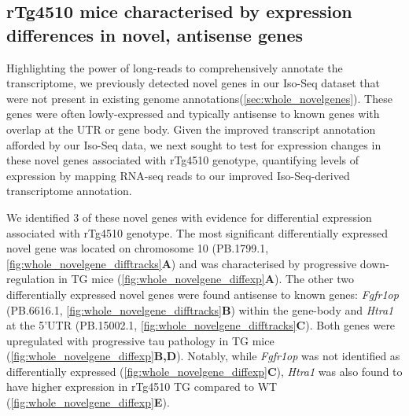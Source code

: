 \clearpage
\subsection{rTg4510 mice characterised by expression differences in novel, antisense genes}
Highlighting the power of long-reads to comprehensively annotate the transcriptome, we previously detected novel genes in our Iso-Seq dataset that were not present in existing genome annotations(\cref{sec:whole_novelgenes}). These genes were often lowly-expressed and typically antisense to known genes with overlap at the UTR or gene body. Given the improved transcript annotation afforded by our Iso-Seq data, we next sought to test for expression changes in these novel genes associated with rTg4510 genotype, quantifying levels of expression by mapping RNA-seq reads to our improved Iso-Seq-derived transcriptome annotation. 

We identified 3 of these novel genes with evidence for differential expression associated with rTg4510 genotype. The most significant differentially expressed novel gene was located on chromosome 10 (PB.1799.1, \cref{fig:whole_novelgene_difftracks}\textbf{A}) and was characterised by progressive down-regulation in TG mice (\cref{fig:whole_novelgene_diffexp}\textbf{A}). The other two differentially expressed novel genes were found antisense to known genes: \textit{Fgfr1op} (PB.6616.1, \cref{fig:whole_novelgene_difftracks}\textbf{B}) within the gene-body and \textit{Htra1} at the 5'UTR (PB.15002.1, \cref{fig:whole_novelgene_difftracks}\textbf{C}). Both genes were upregulated with progressive tau pathology in TG mice (\cref{fig:whole_novelgene_diffexp}\textbf{B,D}). Notably, while \textit{Fgfr1op} was not identified as differentially expressed (\cref{fig:whole_novelgene_diffexp}\textbf{C}), \textit{Htra1} was also found to have higher expression in rTg4510 TG compared to WT (\cref{fig:whole_novelgene_diffexp}\textbf{E}).     

